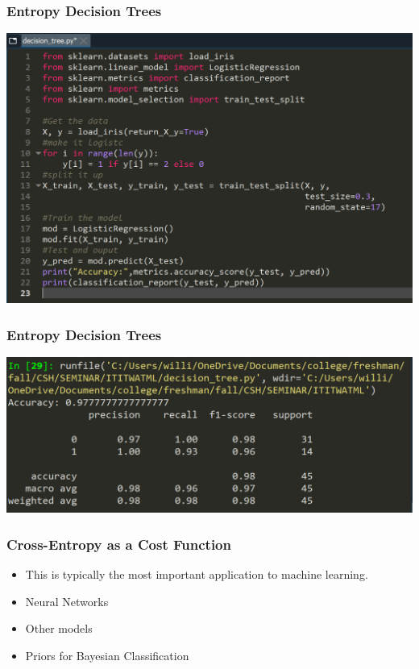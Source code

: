 \documentclass[xcolor=dvipsnames]{beamer}
\begin{document}
	\begin{frame}
    \frametitle{Entropy Decision Trees}
        \begin{center}
            \includegraphics[width=\textwidth]{log_reg.PNG}
        \end{center}
    \end{frame}
    
    \begin{frame}
    \frametitle{Entropy Decision Trees}
        \begin{center}
            \includegraphics[width=\textwidth]{ipythlr.PNG}
        \end{center}
    \end{frame}
	
	\begin{frame}
	\frametitle{Cross-Entropy as a Cost Function}
	    \begin{itemize}
        	\item This is typically the most important application to machine learning. 
        	\pause
        	\item Neural Networks
        	\pause
        	\item Other models
        	\pause
        	\item Priors for Bayesian Classification
	    \end{itemize}
	\end{frame}
	
\end{document}
